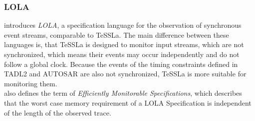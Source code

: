 	\subsubsection{LOLA}
		\cite{LOLA} introduces \textit{LOLA}, a specification language for the observation of synchronous event streams, comparable to TeSSLa. The main difference between these languages is, that TeSSLa is designed to monitor input streams, which are not synchronized, which means their events may occur independently and do not follow a global clock. Because the events of the timing constraints defined in TADL2 and AUTOSAR are also not synchronized, TeSSLa is more suitable for monitoring them.\\
		\cite{LOLA} also defines the term of \textit{Efficiently Monitorable Specifications}, which describes that the worst case memory requirement of a LOLA Specification is independent of the length of the observed trace.
	
